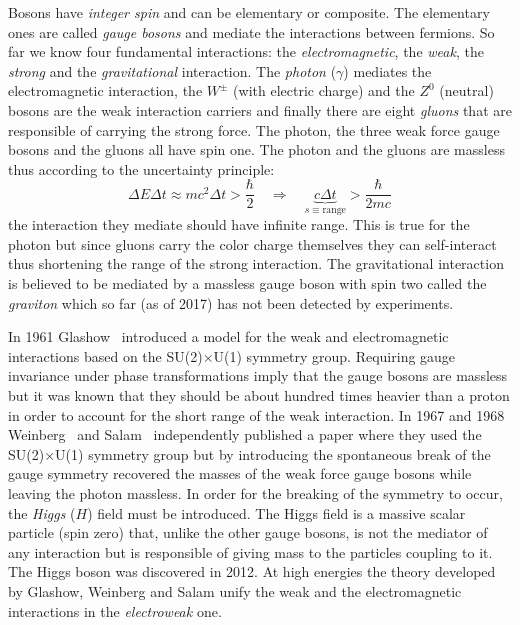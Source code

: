 Bosons have \emph{integer spin} and can be elementary or composite. The
elementary ones are called \emph{gauge bosons} and mediate the interactions
between fermions. So far we know four fundamental interactions: the
\emph{electromagnetic}, the \emph{weak}, the \emph{strong} and the
\emph{gravitational} interaction. The \emph{photon} ($\gamma$) mediates the
electromagnetic interaction, the $W^\pm$ (with electric charge) and the $Z^0$
(neutral) bosons are the weak interaction carriers and finally there are eight
\emph{gluons} that are responsible of carrying the strong force. The photon, the
three weak force gauge bosons and the gluons all have spin one. The photon and
the gluons are massless thus according to the uncertainty principle:
\begin{equation}
  \label{eq:149}
  \Delta E \Delta t \approx mc^2 \Delta t > \frac{\hbar}{2} \quad \Rightarrow \quad
  \underbrace{c \Delta t}_{s \equiv \mathrm{range}} > \frac{\hbar}{2mc}
\end{equation}
the interaction they mediate should have infinite range. This is true for the
photon but since gluons carry the color charge themselves they can self-interact
thus shortening the range of the strong interaction. The gravitational
interaction is believed to be mediated by a massless gauge boson with spin two
called the \emph{graviton} which so far (as of 2017) has not been detected by
experiments.

In 1961 Glashow~\cite{GlashowPaper} introduced a model for the weak and
electromagnetic interactions based on the SU(2)$\times$U(1) symmetry
group. Requiring gauge invariance under phase transformations imply that the
gauge bosons are massless but it was known that they should be about hundred
times heavier than a proton in order to account for the short range of the weak
interaction. In 1967 and 1968 Weinberg~\cite{WeinbergPaper} and
Salam~\cite{SalamPaper} independently published a paper where they used the
SU(2)$\times$U(1) symmetry group but by introducing the spontaneous break of the
gauge symmetry recovered the masses of the weak force gauge bosons while leaving
the photon massless. In order for the breaking of the symmetry to occur, the
\emph{Higgs} ($H$) field must be introduced. The Higgs field is a massive scalar
particle (spin zero) that, unlike the other gauge bosons, is not the mediator of
any interaction but is responsible of giving mass to the particles coupling to
it. The Higgs boson was discovered in 2012. At high energies the theory
developed by Glashow, Weinberg and Salam unify the weak and the electromagnetic
interactions in the \emph{electroweak} one.

